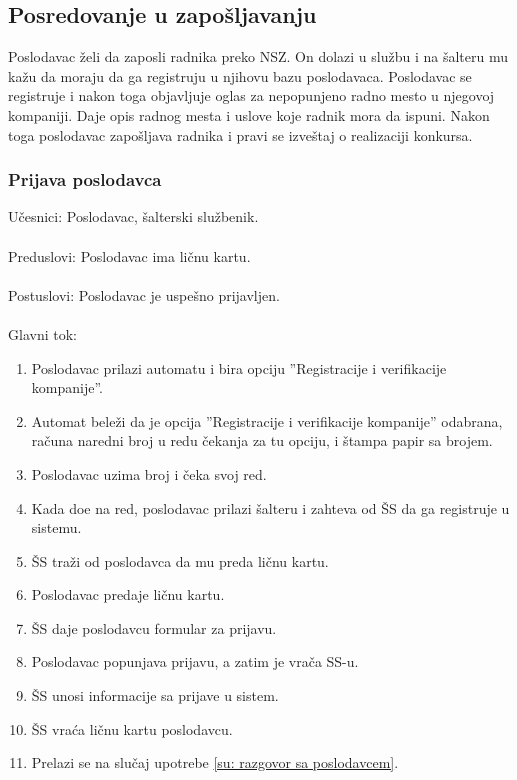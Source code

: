 \subsection{Posredovanje u zapo\v sljavanju}

Poslodavac \v zeli da zaposli radnika preko NSZ. On dolazi u slu\v zbu i na \v salteru mu ka\v zu da moraju da ga registruju u njihovu bazu poslodavaca. Poslodavac se registruje i nakon toga objavljuje oglas za nepopunjeno radno mesto u njegovoj kompaniji. Daje opis radnog mesta i uslove koje radnik mora da ispuni. Nakon toga poslodavac zapo\v sljava radnika i pravi se izve\v staj o realizaciji konkursa. 


\subsubsection{Prijava poslodavca}

\noindent Učesnici: Poslodavac, šalterski službenik.
\\
\\ Preduslovi: Poslodavac ima ličnu kartu.
\\
\\ Postuslovi: Poslodavac je uspešno prijavljen.
\\
\\ Glavni tok:
\begin{enumerate}
\item Poslodavac prilazi automatu i bira opciju ''Registracije i verifikacije kompanije''.
	\item Automat bele\v zi da je opcija ''Registracije i verifikacije kompanije'' odabrana, ra\v cuna naredni broj u redu \v cekanja za tu opciju, i \v stampa papir sa brojem.
	\item Poslodavac uzima broj i \v ceka svoj red.
	\item Kada do\dj e na red, poslodavac prilazi \v salteru i zahteva od \v SS da ga registruje u sistemu.
	\item \v SS tra\v zi od poslodavca da mu preda li\v cnu kartu.
	\item Poslodavac predaje ličnu kartu. 
	\item \v SS daje poslodavcu formular za prijavu.
    \item Poslodavac popunjava prijavu, a zatim je vra\v ca SS-u.
	\item \v SS unosi informacije sa prijave u sistem.
	\item \v SS vra\' ca ličnu kartu poslodavcu.
	\item Prelazi se na slu\v caj upotrebe \ref{su: razgovor sa poslodavcem}.
\end{enumerate}



